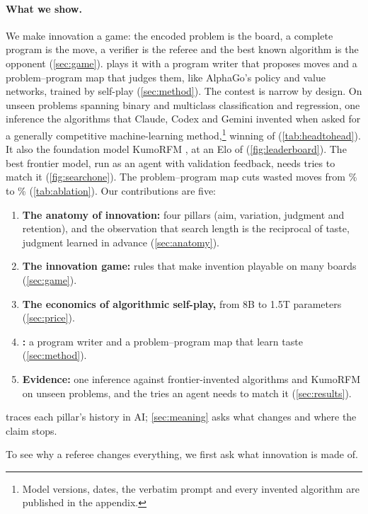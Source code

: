 \paragraph{What we show.}
We make innovation a game: the encoded problem is the board, a complete program
is the move, a verifier is the referee and the best known algorithm is the
opponent (\cref{sec:game}). \EZ{} plays it with a program writer that
proposes moves and a problem--program map that judges them, like AlphaGo's
policy and value networks, trained by self-play (\cref{sec:method}). The
contest is narrow by design. On  unseen problems spanning binary and
multiclass classification and regression, one inference  the
algorithms that Claude, Codex and Gemini invented when asked for a generally
competitive machine-learning method,\footnote{Model versions, dates, the
verbatim prompt and every invented algorithm are published in the appendix.}
winning  of  (\cref{tab:headtohead}). It also 
the foundation model KumoRFM \citep{kumorfm2025}, at an Elo of  (\cref{fig:leaderboard}). The best frontier model, run as an
agent with validation feedback, needs  tries to match it
(\cref{fig:searchone}). The problem--program map cuts wasted moves from
\% to \% (\cref{tab:ablation}). Our contributions are five:
\begin{enumerate}[leftmargin=*,nosep,label=\arabic*.]
  \item \textbf{The anatomy of innovation:} four pillars (aim, variation,
    judgment and retention), and the observation that search length is the
    reciprocal of taste, judgment learned in advance (\cref{sec:anatomy}).
  \item \textbf{The innovation game:} rules that make invention playable on
    many boards (\cref{sec:game}).
  \item \textbf{The economics of algorithmic self-play,} from 8B to 1.5T
    parameters (\cref{sec:price}).
  \item \textbf{\EZ{}:} a program writer and a problem--program map that learn
    taste (\cref{sec:method}).
  \item \textbf{Evidence:} one inference against frontier-invented algorithms
    and KumoRFM on unseen problems, and the tries an agent needs to match it
    (\cref{sec:results}).
\end{enumerate}
 traces each pillar's history in AI; \cref{sec:meaning} asks
what changes and where the claim stops.

To see why a referee changes everything, we first ask what innovation is made
of.
